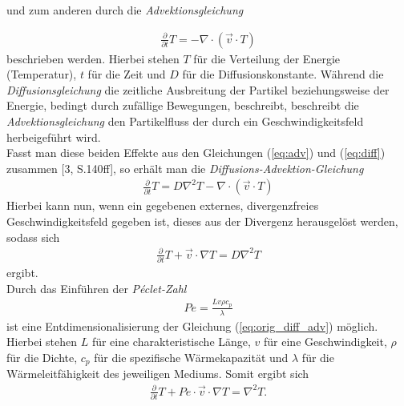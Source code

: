 \documentclass[12pt,a4paper,titlepage,headinclude,bibtotoc]{scrartcl}
\begin{document}
und zum anderen durch die \textit{Advektionsgleichung}

\begin{align}
\label{eq:adv}
\frac{\partial}{\partial t}T = - \nabla \cdot (\vec{v}\cdot T)
\end{align}
beschrieben werden. Hierbei stehen $T$ für die Verteilung der Energie (Temperatur), $t$ für die Zeit und $D$ für die Diffusionskonstante.
Während die \textit{Diffusionsgleichung} die zeitliche Ausbreitung der Partikel beziehungsweise der Energie, bedingt durch zufällige Bewegungen, beschreibt, beschreibt die \textit{Advektionsgleichung} den Partikelfluss der durch ein Geschwindigkeitsfeld herbeigeführt wird.\\
Fasst man diese beiden Effekte aus den Gleichungen (\ref{eq:adv}) und (\ref{eq:diff}) zusammen [3, S.140ff], so erhält man die \textit{Diffusions-Advektion-Gleichung}
\begin{align*}
\frac{\partial}{\partial t}T = D \nabla^2 T - \nabla \cdot (\vec{v}\cdot T)
\end{align*}
Hierbei kann nun, wenn ein gegebenen externes, divergenzfreies Geschwindigkeitsfeld gegeben ist, dieses aus der Divergenz herausgelöst werden, sodass sich
\begin{align}
\label{eq:orig_diff_adv}
\frac{\partial}{\partial t} T + \vec{v} \cdot \nabla T = D \nabla^2 T
\end{align}
ergibt.\\
Durch das Einführen der \textit{Péclet-Zahl}
\begin{align*}
Pe = \frac{L v \rho c_p}{\lambda}
\end{align*}
ist eine Entdimensionalisierung der Gleichung (\ref{eq:orig_diff_adv}) möglich. Hierbei stehen $L$ für eine charakteristische Länge, $v$ für eine Geschwindigkeit, $\rho$ für die Dichte, $c_p$ für die spezifische Wärmekapazität und $\lambda$ für die Wärmeleitfähigkeit des jeweiligen Mediums. Somit ergibt sich
\begin{align}
\label{eq:diff_adv}
\frac{\partial}{\partial t} T + Pe \cdot \vec{v} \cdot \nabla T = \nabla^2 T.
\end{align}
\end{document}
